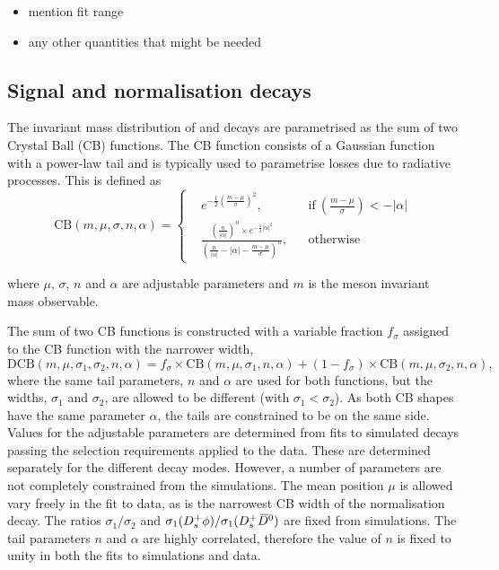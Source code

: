 {\color{Red}
\begin{itemize}
\item mention fit range
\item any other quantities that might be needed
\end{itemize}
}


\subsection{Signal and normalisation decays}
\label{sec:B2DsKK_sigcomps}

The invariant mass distribution of \decay{\Bp}{\Dsp\Dzb} and \decay{\Bp}{\Dsp\Kp\Km} decays are parametrised as the sum of two Crystal Ball (CB) functions.
The CB function consists of a Gaussian function with a power-law tail and is typically used to parametrise losses due to radiative processes.
This is defined as
\begin{equation}
\text{CB}(m,\mu,\sigma,n,\alpha) = \left \{
  \begin{aligned}
    &e^{-\frac{1}{2} \left(\frac{m-\mu}{\sigma}\right)^2}, && \text{if}\ \left(\frac{m-\mu}{\sigma}\right) < -|\alpha|\\
    &\frac{\left(\frac{n}{|\alpha|}\right)^n\times e ^{-\frac{1}{2}|\alpha|^2} }{\left(\frac{n}{|\alpha|}-|\alpha| - \frac{m-\mu}{\sigma}\right)^n}, && \text{otherwise}
  \end{aligned} \right.
\end{equation} 

where $\mu$, $\sigma$, $n$ and $\alpha$ are adjustable parameters and $m$ is the \B meson invariant mass observable.

The sum of two CB functions is constructed with a variable fraction $f_\sigma$ assigned to the CB function with the narrower width,
\begin{equation}
\text{DCB}(m,\mu,\sigma_1,\sigma_2,n,\alpha) = f_\sigma \times \text{CB}(m,\mu,\sigma_1,n,\alpha) + (1-f_\sigma) \times \text{CB}(m,\mu,\sigma_2,n,\alpha),
\label{eq:DoubleBD}
\end{equation}
where the same tail parameters, $n$ and $\alpha$ are used for both functions, but the widths, $\sigma_1$ and $\sigma_2$, are allowed to be different (with $\sigma_1 < \sigma_2$).
As both CB shapes have the same parameter $\alpha$, the tails are constrained to be on the same side.
Values for the adjustable parameters are determined from fits to simulated decays passing the selection requirements applied to the data. These are determined separately for the different \Dsp decay modes. However, a number of parameters are not completely constrained from the simulations. The mean position $\mu$ is allowed vary freely in the fit to data, as is the narrowest CB width of the normalisation decay. The ratios $\sigma_1/\sigma_2$ and $\sigma_{1}({{D}^+_{s}}\phi) / \sigma_{1}({{D}^+_{s}}{{\kern 0.2em\overline{\kern -0.2em D}{}}{}^0})$ are fixed from simulations.
The tail parameters $n$ and $\alpha$ are highly correlated, therefore the value of $n$ is fixed to unity in both the fits to simulations and data. 



